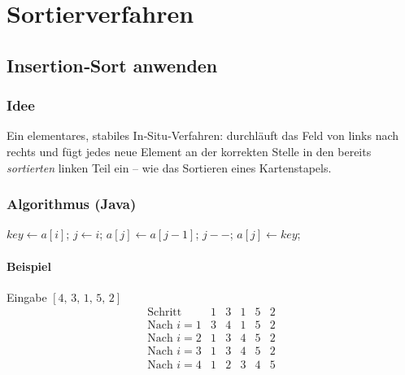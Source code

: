
\chapter{Sortierverfahren}

\section{Insertion‑Sort anwenden}
\subsection*{Idee}
Ein elementares, stabiles In‑Situ‑Verfahren: durchläuft das Feld von links
nach rechts und fügt jedes neue Element an der korrekten Stelle in den bereits
\emph{sortierten} linken Teil ein – wie das Sortieren eines Kartenstapels.

\subsection*{Algorithmus (Java)}
\begin{algorithmic}
    \State $key \gets a[i]$; $j \gets i$;
         \State $a[j] \gets a[j-1]$; $j--$;
    \EndWhile
    \State $a[j] \gets key$;
  \EndFor
\EndFunction
\end{algorithmic}

\subsubsection*{Beispiel}
Eingabe \([4,\,3,\,1,\,5,\,2]\)
\[
\begin{array}{l|lllll}
\text{Schritt}&1&3&1&5&2\\\hline
\text{Nach $i=1$}&3&4&1&5&2\\
\text{Nach $i=2$}&1&3&4&5&2\\
\text{Nach $i=3$}&1&3&4&5&2\\
\text{Nach $i=4$}&1&2&3&4&5
\end{array}
\]

